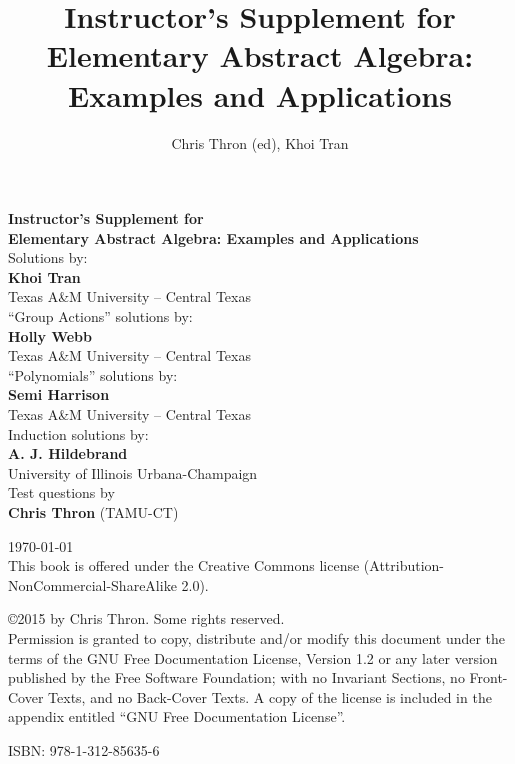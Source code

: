 \documentclass[11pt]{book}
\begin{document}
%
\begin{titlepage}
\title{Instructor's Supplement for Elementary Abstract Algebra: Examples and Applications}
\author{Chris Thron (ed), Khoi Tran}
\begin{center}
\vspace{3.5cm}
{\huge \textbf{Instructor's Supplement for}\\
\textbf{ Elementary Abstract Algebra: Examples and Applications}}\\[1cm]
Solutions by: \\ 
{ \textbf{Khoi Tran } } \\
Texas A\&M University -- Central Texas \\[0.4cm]
``Group Actions'' solutions by: \\ 
{ \textbf{Holly Webb} } \\
Texas A\&M University -- Central Texas \\[0.4cm]
``Polynomials'' solutions by: \\ 
{ \textbf{Semi Harrison } } \\
Texas A\&M University -- Central Texas \\[0.4cm]
Induction solutions by: \\ 
{ \textbf{A. J. Hildebrand } } \\
University of Illinois Urbana-Champaign \\[0.4cm]

Test questions by\\
\textbf {Chris Thron} (TAMU-CT)\\[0.4cm]

\vfill

{\large \today}\\ [1 cm]
This book is offered under the Creative Commons license (Attribution-NonCommercial-ShareAlike 2.0).

\end{center}
\end{titlepage}
\vspace{4cm}


\vfill
\copyright 2015 by Chris Thron. Some rights reserved.\\

Permission is granted to copy, distribute and/or modify this document under the terms of the GNU Free Documentation License, Version 1.2 or any later version published by the Free Software Foundation; with no Invariant Sections, no Front-Cover Texts, and no Back-Cover Texts.  A copy of the license is included in the appendix entitled ``GNU Free Documentation License''.

\begin{center}
ISBN:  978-1-312-85635-6
\end{center}

\clearpage
%
\tableofcontents
%
\mainmatter
%





\clearpage
{}
\printindex
\end{document}
